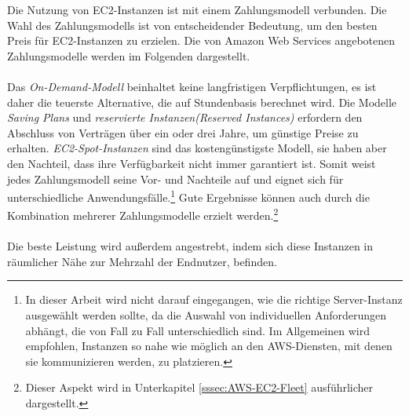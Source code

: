 Die Nutzung von EC2-Instanzen ist mit einem Zahlungsmodell verbunden. Die Wahl des Zahlungsmodells ist von entscheidender Bedeutung, um den besten Preis für EC2-Instanzen zu erzielen.
Die von Amazon Web Services angebotenen Zahlungsmodelle werden im Folgenden dargestellt.
\\\\
Das \textit{On-Demand-Modell} beinhaltet keine langfristigen Verpflichtungen, es ist daher die teuerste Alternative, die auf Stundenbasis berechnet wird. Die Modelle \textit{Saving Plans} und \textit{reservierte Instanzen(Reserved Instances)} erfordern den Abschluss von Verträgen über ein oder drei Jahre, um günstige Preise zu erhalten. \textit{EC2-Spot-Instanzen} sind das kostengünstigste Modell, sie haben aber den Nachteil, dass ihre Verfügbarkeit nicht immer garantiert ist. Somit weist jedes Zahlungsmodell seine Vor- und Nachteile auf und eignet sich für unterschiedliche Anwendungsfälle.\footnote{In dieser Arbeit wird nicht darauf eingegangen, wie die richtige Server-Instanz ausgewählt werden sollte, da die Auswahl von individuellen Anforderungen abhängt, die von Fall zu Fall unterschiedlich sind. Im Allgemeinen wird empfohlen, Instanzen so nahe wie möglich an den AWS-Diensten, mit denen sie kommunizieren werden, zu platzieren.} Gute Ergebnisse können auch durch die Kombination mehrerer Zahlungsmodelle erzielt werden.\footnote{Dieser Aspekt wird in Unterkapitel \ref{sssec:AWS-EC2-Fleet} ausführlicher dargestellt.} %
\\\\
Die beste Leistung wird außerdem angestrebt, indem sich diese Instanzen in räumlicher Nähe zur Mehrzahl der Endnutzer, befinden. 
